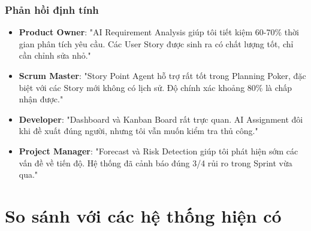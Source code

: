 \documentclass[12pt,a4paper]{report}
\begin{document}
\subsubsection{Phản hồi định tính}

\begin{itemize}
\item \textbf{Product Owner}: "AI Requirement Analysis giúp tôi tiết kiệm 60-70\% thời gian phân tích yêu cầu. Các User Story được sinh ra có chất lượng tốt, chỉ cần chỉnh sửa nhỏ."
\item \textbf{Scrum Master}: "Story Point Agent hỗ trợ rất tốt trong Planning Poker, đặc biệt với các Story mới không có lịch sử. Độ chính xác khoảng 80\% là chấp nhận được."
\item \textbf{Developer}: "Dashboard và Kanban Board rất trực quan. AI Assignment đôi khi đề xuất đúng người, nhưng tôi vẫn muốn kiểm tra thủ công."
\item \textbf{Project Manager}: "Forecast và Risk Detection giúp tôi phát hiện sớm các vấn đề về tiến độ. Hệ thống đã cảnh báo đúng 3/4 rủi ro trong Sprint vừa qua."
\end{itemize}

\section{So sánh với các hệ thống hiện có}
\end{document}
